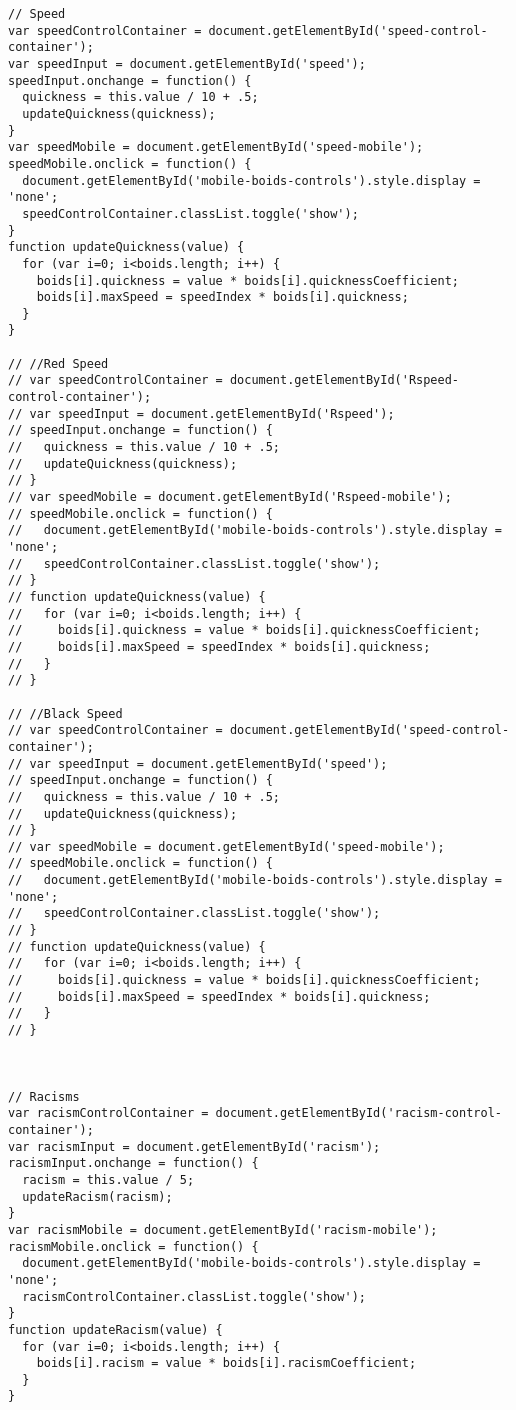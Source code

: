 \begin{lstlisting}
// Speed
var speedControlContainer = document.getElementById('speed-control-container');
var speedInput = document.getElementById('speed');
speedInput.onchange = function() {
  quickness = this.value / 10 + .5;
  updateQuickness(quickness);
}
var speedMobile = document.getElementById('speed-mobile');
speedMobile.onclick = function() {
  document.getElementById('mobile-boids-controls').style.display = 'none';
  speedControlContainer.classList.toggle('show');
}
function updateQuickness(value) {
  for (var i=0; i<boids.length; i++) {
    boids[i].quickness = value * boids[i].quicknessCoefficient;
    boids[i].maxSpeed = speedIndex * boids[i].quickness;
  }
}

// //Red Speed
// var speedControlContainer = document.getElementById('Rspeed-control-container');
// var speedInput = document.getElementById('Rspeed');
// speedInput.onchange = function() {
//   quickness = this.value / 10 + .5;
//   updateQuickness(quickness);
// }
// var speedMobile = document.getElementById('Rspeed-mobile');
// speedMobile.onclick = function() {
//   document.getElementById('mobile-boids-controls').style.display = 'none';
//   speedControlContainer.classList.toggle('show');
// }
// function updateQuickness(value) {
//   for (var i=0; i<boids.length; i++) {
//     boids[i].quickness = value * boids[i].quicknessCoefficient;
//     boids[i].maxSpeed = speedIndex * boids[i].quickness;
//   }
// }

// //Black Speed
// var speedControlContainer = document.getElementById('speed-control-container');
// var speedInput = document.getElementById('speed');
// speedInput.onchange = function() {
//   quickness = this.value / 10 + .5;
//   updateQuickness(quickness);
// }
// var speedMobile = document.getElementById('speed-mobile');
// speedMobile.onclick = function() {
//   document.getElementById('mobile-boids-controls').style.display = 'none';
//   speedControlContainer.classList.toggle('show');
// }
// function updateQuickness(value) {
//   for (var i=0; i<boids.length; i++) {
//     boids[i].quickness = value * boids[i].quicknessCoefficient;
//     boids[i].maxSpeed = speedIndex * boids[i].quickness;
//   }
// }



// Racisms
var racismControlContainer = document.getElementById('racism-control-container');
var racismInput = document.getElementById('racism');
racismInput.onchange = function() {
  racism = this.value / 5;
  updateRacism(racism);
}
var racismMobile = document.getElementById('racism-mobile');
racismMobile.onclick = function() {
  document.getElementById('mobile-boids-controls').style.display = 'none';
  racismControlContainer.classList.toggle('show');
}
function updateRacism(value) {
  for (var i=0; i<boids.length; i++) {
    boids[i].racism = value * boids[i].racismCoefficient;
  }
}


\end{lstlisting}
